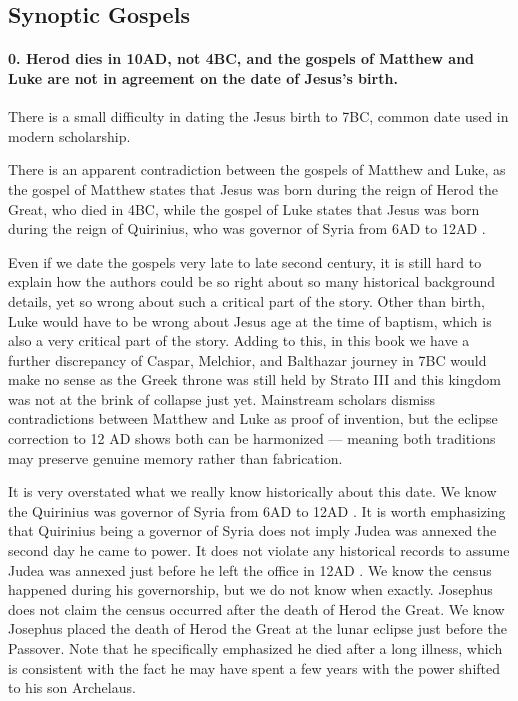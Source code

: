 \subsection{Synoptic Gospels}\label{subsec:synoptic-gospels}

\paragraph{0.
Herod dies in 10AD, not 4BC, and the gospels of Matthew and Luke are not in agreement on the date of Jesus's birth.}\label{par:herod-dies-in-10ad-not-4bc-and-the-gospels-of-matthew-and-luke-are-not-in-agreement-on-the-date-of-jesuss-birth.}

There is a small difficulty in dating the Jesus birth to 7BC, common date used in modern scholarship.

There is an apparent contradiction between the gospels of Matthew and Luke, as the gospel of Matthew states that Jesus was born during the reign of Herod the Great, who died in 4BC, while the gospel of Luke states that Jesus was born during the reign of Quirinius, who was governor of Syria from 6AD to 12AD .

Even if we date the gospels very late to late second century, it is still hard to explain how the authors could be so right about so many historical background details, yet so wrong about such a critical part of the story.
Other than birth, Luke would have to be wrong about Jesus age at the time of baptism, which is also a very critical part of the story.
Adding to this, in this book we have a further discrepancy of Caspar, Melchior, and Balthazar journey in 7BC would make no sense as the Greek throne was still held by Strato III and this kingdom was not at the brink of collapse just yet.
Mainstream scholars dismiss contradictions between Matthew and Luke as proof of invention, but the eclipse correction to 12 AD shows both can be harmonized — meaning both traditions may preserve genuine memory rather than fabrication.

It is very overstated what we really know historically about this date.
We know the Quirinius was governor of Syria from 6AD to 12AD .
It is worth emphasizing that Quirinius being a governor of Syria does not imply Judea was annexed the second day he came to power.
It does not violate any historical records to assume Judea was annexed just before he left the office in 12AD .
We know the census happened during his governorship, but we do not know when exactly.
Josephus does not claim the census occurred after the death of Herod the Great.
We know Josephus placed the death of Herod the Great at the lunar eclipse just before the Passover.
Note that he specifically emphasized he died after a long illness, which is consistent with the fact he may have spent a few years with the power shifted to his son Archelaus.

